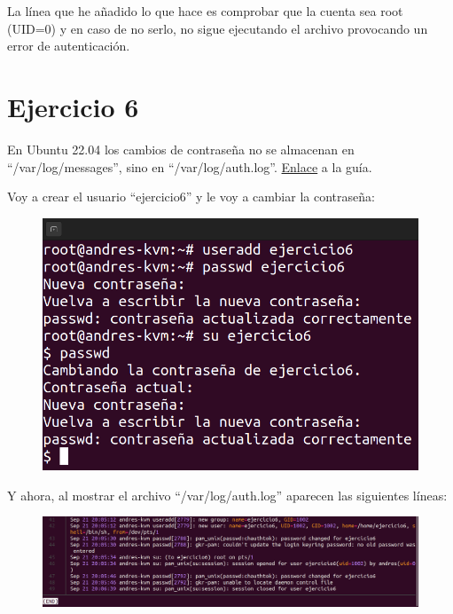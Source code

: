 \documentclass{article}
\begin{document}
La línea que he añadido lo que hace es comprobar que la cuenta sea root (UID=0) y en caso de no serlo, no sigue ejecutando el archivo provocando un error de autenticación.


\section*{Ejercicio 6}
En Ubuntu 22.04 los cambios de contraseña no se almacenan en ``/var/log/messages'', sino en ``/var/log/auth.log''. \href{https://ubuntu.com/tutorials/viewing-and-monitoring-log-files#2-log-files-locations}{Enlace} a la guía.


Voy a crear el usuario ``ejercicio6'' y le voy a cambiar la contraseña:

\begin{figure}[H]
    \includegraphics[width=\textwidth]{imagenes/createejercicio6.png}
\end{figure}

Y ahora, al mostrar el archivo ``/var/log/auth.log'' aparecen las siguientes líneas:

\begin{figure}[H]
    \includegraphics[width=\textwidth]{imagenes/authcreateejercicio6.png}
\end{figure}

\end{document}
